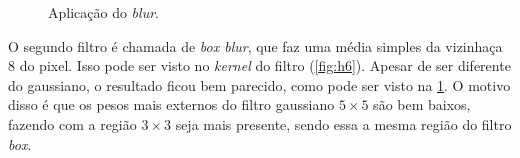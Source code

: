 \begin{figure}[H]
    \caption{Aplicação do \textit{blur}.}
    \label{fig:blur}
\end{figure}

O segundo filtro é chamada de \textit{box blur}, que faz uma média simples da vizinhaça 8 do pixel. Isso pode ser visto no \textit{kernel} do filtro (\cref{fig:h6}). Apesar de ser diferente do gaussiano, o resultado ficou bem parecido, como pode ser visto na \cref{fig:blur}. O motivo disso é que os pesos mais externos do filtro gaussiano $5 \times 5$ são bem baixos, fazendo com a região $3 \times 3$ seja mais presente, sendo essa a mesma região do filtro \textit{box}.
